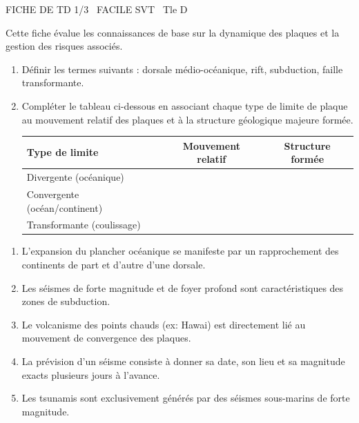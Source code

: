 \documentclass[11pt]{article}
\begin{document}
\begin{tcolorbox}[enhanced,colback=popink,colframe=popink,arc=10pt,boxrule=0pt,left=12pt,right=12pt,top=9pt,bottom=9pt]
{\color{white}\popxbold\small FICHE DE TD 1/3 \textbullet\ FACILE \hfill SVT \textbullet\ Tle D\par}
\end{tcolorbox}
\vspace{4pt}
Cette fiche évalue les connaissances de base sur la dynamique des plaques et la gestion des risques associés.

\begin{exercice}
\begin{enumerate}
    \item Définir les termes suivants : dorsale médio-océanique, rift, subduction, faille transformante.
    \item Compléter le tableau ci-dessous en associant chaque type de limite de plaque au mouvement relatif des plaques et à la structure géologique majeure formée.
    \begin{tabular}{|l|c|c|}
    \hline
    \textbf{Type de limite} & \textbf{Mouvement relatif} & \textbf{Structure formée} \\
    \hline
    Divergente (océanique) & & \\
    \hline
    Convergente (océan/continent) & & \\
    \hline
    Transformante (coulissage) & & \\
    \hline
    \end{tabular}
\end{enumerate}
\end{exercice}

\begin{exercice}
\begin{enumerate}
    \item L'expansion du plancher océanique se manifeste par un rapprochement des continents de part et d'autre d'une dorsale.
    \item Les séismes de forte magnitude et de foyer profond sont caractéristiques des zones de subduction.
    \item Le volcanisme des points chauds (ex: Hawai) est directement lié au mouvement de convergence des plaques.
    \item La prévision d'un séisme consiste à donner sa date, son lieu et sa magnitude exacts plusieurs jours à l'avance.
    \item Les tsunamis sont exclusivement générés par des séismes sous-marins de forte magnitude.
\end{enumerate}
\end{exercice}
\end{document}
